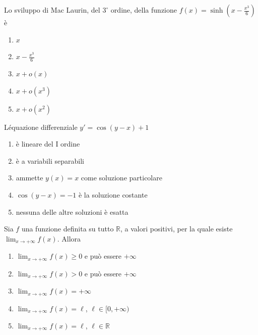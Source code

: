 \begin{quiz}
Lo sviluppo di Mac Laurin, del $3^\circ$ ordine, della funzione $f(x)=\sinh\left(x-\frac{x^3}{6}\right)$ \`e
\begin{enumerate}
\item $x$
\item $x-\frac{x^3}{6}$
\item $x+o(x)$
\item $x+o(x^3)$
\item $x+o(x^2)$
\end{enumerate}
\end{quiz}

\begin{quiz}
L\'equazione differenziale $y\prime=\cos(y-x)+1$
\begin{enumerate}
\item \`e lineare del I ordine
\item \`e a variabili separabili
\item ammette $y(x)=x$ come soluzione particolare
\item $\cos(y-x)=-1$ \`e la soluzione costante
\item nessuna delle altre soluzioni \`e esatta
\end{enumerate}
\end{quiz}

\begin{quiz}
Sia $f$ una funzione definita su tutto $\mathbb R$, a valori positivi, per la quale esiste $\lim_{x\to+\infty}f(x)$. Allora
\begin{enumerate}
\item $\lim_{x\to+\infty}f(x)\geq0$ e pu\`o essere $+\infty$
\item $\lim_{x\to+\infty}f(x)>0$ e pu\`o essere $+\infty$
\item $\lim_{x\to+\infty}f(x)=+\infty$
\item $\lim_{x\to+\infty}f(x)=\ell$, $\ell\in[0,+\infty)$
\item $\lim_{x\to+\infty}f(x)=\ell$, $\ell\in\mathbb R$
\end{enumerate}
\end{quiz}

